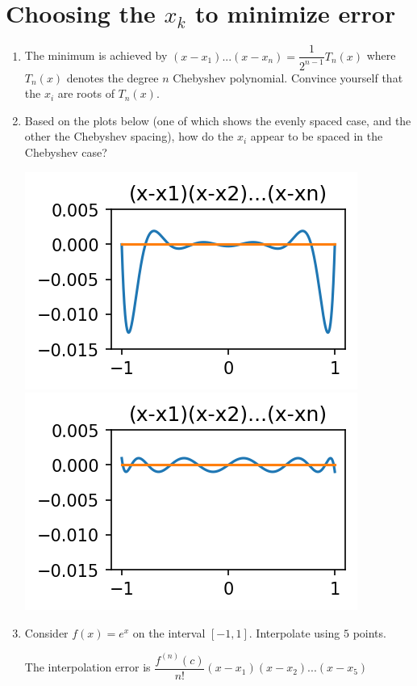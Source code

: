 \documentclass[12pt,letterpaper,noanswers]{exam}
\begin{document}
\section*{Choosing the $x_k$ to minimize error}




\begin{enumerate}[resume]
\itemsep60pt
\item The minimum is achieved by $(x-x_1)...(x-x_n) = \dfrac{1}{2^{n-1}}T_n(x)$ where $T_n(x)$ denotes the degree $n$ Chebyshev polynomial. 
Convince yourself that the $x_i$ are roots of $T_n(x)$.
\item Based on the plots below (one of which shows the evenly spaced case, and the other the Chebyshev spacing), how do the $x_i$ appear to be spaced in the Chebyshev case?

\includegraphics{AM111-F23-CourseNotes/img/C10-error.png}\includegraphics{AM111-F23-CourseNotes/img/C10-error-Ch.png}

\item Consider $f(x) = e^x$ on the interval $[-1,1]$.  Interpolate using $5$ points.

The interpolation error is $\dfrac{f^{(n)}(c)}{n!}(x-x_1)(x-x_2)...(x-x_5)$
\vspace{1in}
\end{enumerate}
\end{document}
